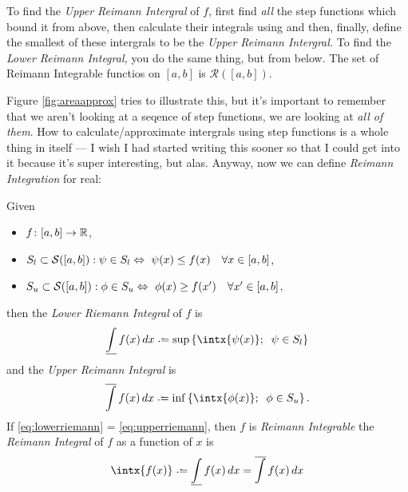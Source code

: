 \medskip
To find the \emph{Upper Reimann Intergral} of $f$, first find \emph{all} the step functions which bound it from above, then calculate their integrals using  and then, finally, define the smallest of these intergrals to be the \emph{Upper Reimann Intergral.} To find the \emph{Lower Reimann Integral,} you do the same thing, but from below. The set of Reimann Integrable functios on $[a,b]$ is $\mathcal{R}([a, b])$.

\medskip
Figure \ref{fig:areaapprox} tries to illustrate this, but it's important to remember that we aren't looking at a seqence of step functions, we are looking at \emph{all of them}. How to calculate/approximate intergrals using step functions is a whole thing in itself --- I wish I had started writing this sooner so that I could get into it because it's super interesting, but alas. Anyway, now we can define \emph{Reimann Integration} for real:

\begin{definition}
	Given  
	\begin{itemize}
	\item
		$f\colon [a, b] \rightarrow \mathbb{R}$,
	\item
		$S_l \subset \mathcal{S}([a, b]) : \psi \in S_l \Leftrightarrow \ \psi(x) \leq f(x) \quad \forall x \in [a, b] $,
	\item
		$S_u \subset \mathcal{S}([a, b]) : \phi \in S_u \Leftrightarrow \ \phi(x) \geq f(x') \quad \forall x' \in [a, b] $,
	\end{itemize}
	then the \emph{Lower Riemann Integral} of $f$ is
	\begin{equation}
		\underline {\int} \, f(x) \, dx \defeq \sup \left\{\intx{\psi(x)}; \;\; \psi \in S_l\right\}
		\label{eq:lowerriemann}
	\end{equation} 
	and the \emph{Upper Reimann Integral} is
	\begin{equation}
		\overline {\int} \, f(x) \, dx \defeq \inf \left\{\intx{\phi(x)}; \;\; \phi \in S_u\right\}.
		\label{eq:upperriemann}
	\end{equation}
	If \eqref{eq:lowerriemann} = \eqref{eq:upperriemann}, then $f$ is \emph{Reimann Integrable} the \emph{Reimann Integral} of $f$ as a function of $x$ is 
	\begin{equation}
		\intx{f(x)} \defeq \underline {\int} \, f(x) \, dx = \overline {\int} \, f(x) \, dx
	\end{equation}
\end{definition}